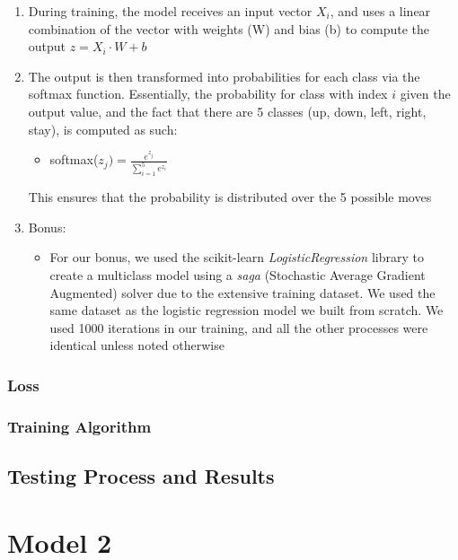 \documentclass[11pt]{article}
\begin{document}
\begin{enumerate}
    \item During training, the model receives an input vector $X_i$, and uses a linear combination of the vector with weights (W) and bias (b) to compute the output $z = X_i \cdot W + b$
    \item The output is then transformed into probabilities for each class via the softmax function. Essentially, the probability for class with index $i$ given the output value, and the fact that there are 5 classes (up, down, left, right, stay), is computed as such:
    \begin{itemize}
        \item softmax($z_j) = \frac{e^{z_j}}{\sum_{i=1}^{5} e^{z_i}}$
    \end{itemize}
    This ensures that the probability is distributed over the 5 possible moves
    \item Bonus:
    \begin{itemize}
        \item For our bonus, we used the scikit-learn \emph{LogisticRegression} library to create a multiclass model using a \emph{saga} (Stochastic Average Gradient Augmented) solver due to the extensive training dataset. We used the same dataset as the logistic regression model we built from scratch. We used 1000 iterations in our training, and all the other processes were identical unless noted otherwise
    \end{itemize}
\end{enumerate}

\subsubsection{Loss}

\subsubsection{Training Algorithm}

\subsection{Testing Process and Results}

\section{Model 2}

\end{document}
